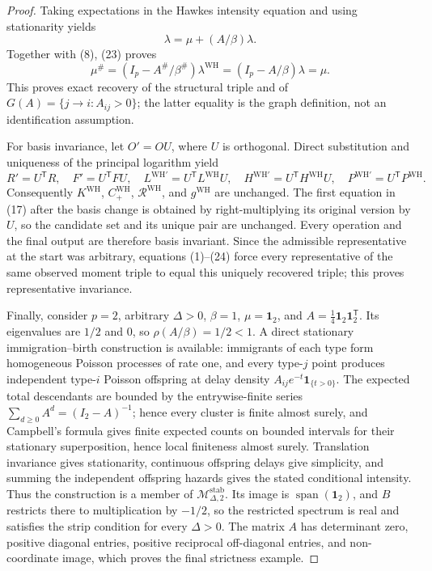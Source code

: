\documentclass{article}
\begin{document}
\begin{proof}
Taking expectations in the Hawkes intensity equation and using stationarity yields
\[
 \lambda=\mu+(A/\beta)\lambda.
\tag{23}
\]
Together with (8), (23) proves
\[
 \mu^{\#}=(I_p-A^{\#}/\beta^{\#})\lambda^{\mathrm{WH}}
 =(I_p-A/\beta)\lambda=\mu.
\tag{24}
\]
This proves exact recovery of the structural triple and of \(G(A)=\{j\to i:A_{ij}>0\}\); the latter equality is the graph definition, not an identification assumption.

For basis invariance, let \(O'=OU\), where \(U\) is orthogonal.  Direct substitution and uniqueness of the principal logarithm yield
\[
 R'=U^{\mathsf T}R,\quad F'=U^{\mathsf T}FU,\quad
 L^{\mathrm{WH}\prime}=U^{\mathsf T}L^{\mathrm{WH}}U,\quad
 H^{\mathrm{WH}\prime}=U^{\mathsf T}H^{\mathrm{WH}}U,\quad
 P^{\mathrm{WH}\prime}=U^{\mathsf T}P^{\mathrm{WH}}.
\tag{25}
\]
Consequently \(K^{\mathrm{WH}}\), \(C_{+}^{\mathrm{WH}}\), \(\mathcal R^{\mathrm{WH}}\), and \(g^{\mathrm{WH}}\) are unchanged.  The first equation in (17) after the basis change is obtained by right-multiplying its original version by \(U\), so the candidate set and its unique pair are unchanged.  Every operation and the final output are therefore basis invariant.  Since the admissible representative at the start was arbitrary, equations (1)--(24) force every representative of the same observed moment triple to equal this uniquely recovered triple; this proves representative invariance.

Finally, consider \(p=2\), arbitrary \(\Delta>0\), \(\beta=1\), \(\mu=\mathbf 1_2\), and \(A=\tfrac14\mathbf 1_2\mathbf 1_2^{\mathsf T}\).  Its eigenvalues are \(1/2\) and \(0\), so \(\rho(A/\beta)=1/2<1\).  A direct stationary immigration--birth construction is available: immigrants of each type form homogeneous Poisson processes of rate one, and every type-\(j\) point produces independent type-\(i\) Poisson offspring at delay density \(A_{ij}e^{-t}\mathbf 1_{\{t>0\}}\).  The expected total descendants are bounded by the entrywise-finite series \(\sum_{d\geq0}A^d=(I_2-A)^{-1}\); hence every cluster is finite almost surely, and Campbell's formula gives finite expected counts on bounded intervals for their stationary superposition, hence local finiteness almost surely.  Translation invariance gives stationarity, continuous offspring delays give simplicity, and summing the independent offspring hazards gives the stated conditional intensity.  Thus the construction is a member of \(\mathcal M_{\Delta,2}^{\mathrm{stab}}\).  Its image is \(\operatorname{span}(\mathbf 1_2)\), and \(B\) restricts there to multiplication by \(-1/2\), so the restricted spectrum is real and satisfies the strip condition for every \(\Delta>0\).  The matrix \(A\) has determinant zero, positive diagonal entries, positive reciprocal off-diagonal entries, and non-coordinate image, which proves the final strictness example.
\end{proof}
\end{document}
